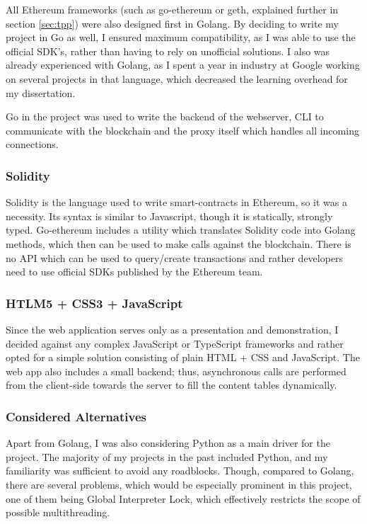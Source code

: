 All Ethereum frameworks (such as go-ethereum or geth, explained further in section \ref{sec:tpp}) were also designed first in Golang. By deciding to write my project in Go as well, I ensured maximum compatibility, as I was able to use the official SDK's, rather than having to rely on unofficial solutions. I also was already experienced with Golang, as I spent a year in industry at Google working on several projects in that language, which decreased the learning overhead for my dissertation.

Go in the project was used to write the backend of the webserver, CLI to communicate with the blockchain and the proxy itself which handles all incoming connections.
\subsubsection{Solidity}
Solidity \cite{dannen2017introducing} is the language used to write smart-contracts in Ethereum, so it was a necessity. Its syntax is similar to Javascript, though it is statically, strongly typed. Go-ethereum includes a utility which translates Solidity code into Golang methods, which then can be used to make calls against the blockchain. There is no API which can be used to query/create transactions and rather developers need to use official SDKs published by the Ethereum team.
\subsubsection{HTLM5 + CSS3 + JavaScript}
Since the web application serves only as a presentation and demonstration, I decided against any complex JavaScript or TypeScript frameworks and rather opted for a simple solution consisting of plain HTML + CSS and JavaScript. The web app also includes a small backend; thus, asynchronous calls are performed from the client-side towards the server to fill the content tables dynamically.
\subsubsection{Considered Alternatives}
Apart from Golang, I was also considering Python as a main driver for the project. The majority of my projects in the past included Python, and my familiarity was sufficient to avoid any roadblocks. Though, compared to Golang, there are several problems, which would be especially prominent in this project, one of them being Global Interpreter Lock\cite{beazley2010understanding}, which effectively restricts the scope of possible multithreading.

